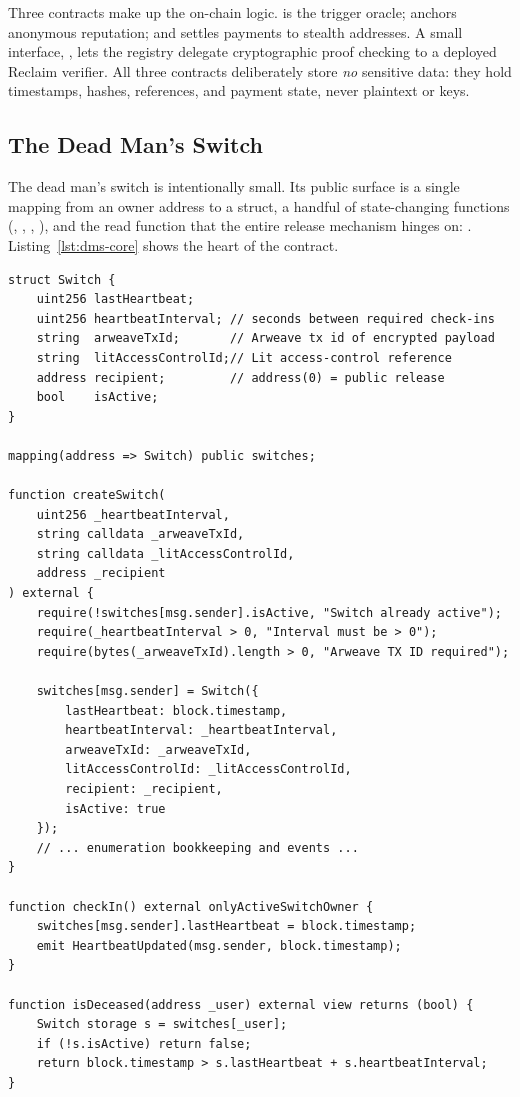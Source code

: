 Three contracts make up the on-chain logic.  is the trigger
oracle;  anchors anonymous reputation; and
 settles payments to stealth addresses. A small interface,
, lets the registry delegate cryptographic proof checking to a
deployed Reclaim verifier. All three contracts deliberately store \emph{no}
sensitive data: they hold timestamps, hashes, references, and payment state, never
plaintext or keys.

\subsection{The Dead Man's Switch}
\label{sec:impl-dms}

The dead man's switch is intentionally small. Its public surface is a single
mapping from an owner address to a  struct, a handful of
state-changing functions (, ,
, ), and the read function that
the entire release mechanism hinges on: \isdeceased. Listing~\ref{lst:dms-core}
shows the heart of the contract.

\begin{lstlisting}[language=Solidity,caption={The switch struct and the trigger predicate (\code{DeadMansSwitch.sol}).},label={lst:dms-core}]
struct Switch {
    uint256 lastHeartbeat;
    uint256 heartbeatInterval; // seconds between required check-ins
    string  arweaveTxId;       // Arweave tx id of encrypted payload
    string  litAccessControlId;// Lit access-control reference
    address recipient;         // address(0) = public release
    bool    isActive;
}

mapping(address => Switch) public switches;

function createSwitch(
    uint256 _heartbeatInterval,
    string calldata _arweaveTxId,
    string calldata _litAccessControlId,
    address _recipient
) external {
    require(!switches[msg.sender].isActive, "Switch already active");
    require(_heartbeatInterval > 0, "Interval must be > 0");
    require(bytes(_arweaveTxId).length > 0, "Arweave TX ID required");

    switches[msg.sender] = Switch({
        lastHeartbeat: block.timestamp,
        heartbeatInterval: _heartbeatInterval,
        arweaveTxId: _arweaveTxId,
        litAccessControlId: _litAccessControlId,
        recipient: _recipient,
        isActive: true
    });
    // ... enumeration bookkeeping and events ...
}

function checkIn() external onlyActiveSwitchOwner {
    switches[msg.sender].lastHeartbeat = block.timestamp;
    emit HeartbeatUpdated(msg.sender, block.timestamp);
}

function isDeceased(address _user) external view returns (bool) {
    Switch storage s = switches[_user];
    if (!s.isActive) return false;
    return block.timestamp > s.lastHeartbeat + s.heartbeatInterval;
}
\end{lstlisting}

